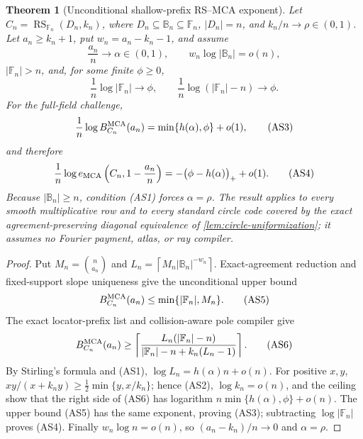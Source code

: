 \documentclass[12pt,a4paper]{amsart}
\numberwithin{equation}{section}
\newtheorem{theorem}{Theorem}[section]
\theoremstyle{remark}
\DeclareMathOperator{\RS}{RS}
\newcommand{\F}{\mathbb F}
\newcommand{\B}{\mathbb B}
\newcommand{\abs}[1]{\lvert #1\rvert}
\newcommand{\ceil}[1]{\left\lceil #1\right\rceil}
\begin{document}
\begin{theorem}[Unconditional shallow-prefix RS--MCA exponent]
\label{thm:unconditional-asymptotic-rs-mca}
Let \(C_n=\RS_{\F_n}(D_n,k_n)\), where
\(D_n\subseteq\B_n\subseteq\F_n\), \(\abs{D_n}=n\), and
\(k_n/n\to\rho\in(0,1)\).  Let \(a_n\ge k_n+1\), put
\(w_n=a_n-k_n-1\), and assume
\[
 \frac{a_n}{n}\to\alpha\in(0,1),\qquad
 w_n\log\abs{\B_n}=o(n),                           \tag{AS1}
\]
\(\abs{\F_n}>n\), and, for some finite \(\phi\ge0\),
\[
 \frac1n\log\abs{\F_n}\to\phi,
 \qquad
 \frac1n\log(\abs{\F_n}-n)\to\phi.               \tag{AS2}
\]
For the full-field challenge,
\[
 \frac1n\log B_{C_n}^{\rm MCA}(a_n)
   =\min\{h(\alpha),\phi\}+o(1),                   \tag{AS3}
\]
and therefore
\[
 \frac1n\log e_{\rm MCA}
   \left(C_n,1-\frac{a_n}{n}\right)
   =-\bigl(\phi-h(\alpha)\bigr)_++o(1).            \tag{AS4}
\]
Because \(\abs{\B_n}\ge n\), condition \textup{(AS1)} forces
\(\alpha=\rho\).  The result applies to every smooth multiplicative row
and to every standard circle code covered by the exact
agreement-preserving diagonal equivalence of
\cref{lem:circle-uniformization}; it assumes no Fourier payment, atlas, or
ray compiler.
\end{theorem}

\begin{proof}
Put \(M_n=\binom n{a_n}\) and
\(L_n=\ceil{M_n\abs{\B_n}^{-w_n}}\).  Exact-agreement reduction and
fixed-support slope uniqueness give the unconditional upper bound
\[
 B_{C_n}^{\rm MCA}(a_n)\le\min\{\abs{\F_n},M_n\}.  \tag{AS5}
\]
The exact locator-prefix list and collision-aware pole compiler give
\[
 B_{C_n}^{\rm MCA}(a_n)\ge
 \left\lceil
 \frac{L_n(\abs{\F_n}-n)}
 {\abs{\F_n}-n+k_n(L_n-1)}
 \right\rceil.                                     \tag{AS6}
\]
By Stirling's formula and \textup{(AS1)},
\(\log L_n=h(\alpha)n+o(n)\).  For positive \(x,y\),
\(xy/(x+k_ny)\ge\frac12\min\{y,x/k_n\}\); hence
\textup{(AS2)}, \(\log k_n=o(n)\), and the ceiling show that the
right side of \textup{(AS6)} has logarithm
\(n\min\{h(\alpha),\phi\}+o(n)\).  The upper bound
\textup{(AS5)} has the same exponent, proving \textup{(AS3)}; subtracting
\(\log\abs{\F_n}\) proves \textup{(AS4)}.  Finally
\(w_n\log n=o(n)\), so \((a_n-k_n)/n\to0\) and
\(\alpha=\rho\).
\end{proof}
\end{document}
